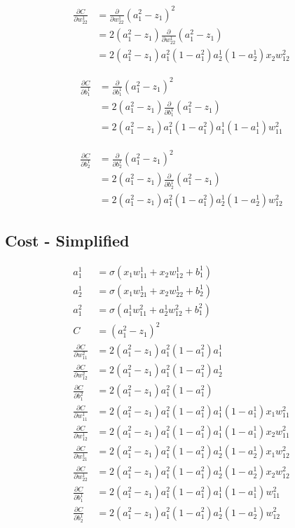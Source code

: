 \documentclass{article}
\begin{document}
\begin{align*}
\frac{\partial C}{\partial w^1_{22}} &= \frac{\partial}{\partial w^1_{22}} (a^2_1 - z_1)^2\\
&= 2 (a^2_1 - z_1) \frac{\partial}{\partial w^1_{22}} (a^2_1 - z_1)\\
&= 2 (a^2_1 - z_1) a^2_1(1 - a^2_1)a^1_2(1 - a^1_2)x_2w^2_{12}
\end{align*}

\begin{align*}
\frac{\partial C}{\partial b^1_1} &= \frac{\partial}{\partial b^1_1} (a^2_1 - z_1)^2\\
&= 2 (a^2_1 - z_1) \frac{\partial}{\partial b^1_1} (a^2_1 - z_1)\\
&= 2 (a^2_1 - z_1) a^2_1(1 - a^2_1)a^1_1(1 - a^1_1)w^2_{11}
\end{align*}

\begin{align*}
\frac{\partial C}{\partial b^1_2} &= \frac{\partial}{\partial b^1_2} (a^2_1 - z_1)^2\\
&= 2 (a^2_1 - z_1) \frac{\partial}{\partial b^1_2} (a^2_1 - z_1)\\
&= 2 (a^2_1 - z_1) a^2_1(1 - a^2_1)a^1_2(1 - a^1_2)w^2_{12}
\end{align*}

\subsection{Cost - Simplified}

\begin{align*}
a^1_1 &= \sigma(x_1 w^1_{11} + x_2 w^1_{12} + b^1_1)\\
a^1_2 &= \sigma(x_1 w^1_{21} + x_2 w^1_{22} + b^1_2)\\
a^2_1 &= \sigma(a^1_1 w^2_{11} + a^1_2 w^2_{12} + b^2_1)\\
%
C &= (a^2_1 - z_1)^2\\
%
\frac{\partial C}{\partial w^2_{11}} &= 2 (a^2_1 - z_1) a^2_1(1 - a^2_1)a^1_1\\
%
\frac{\partial C}{\partial w^2_{12}} &= 2 (a^2_1 - z_1) a^2_1(1 - a^2_1)a^1_2\\
%
\frac{\partial C}{\partial b^2_{1}} &= 2 (a^2_1 - z_1) a^2_1(1 - a^2_1)\\
%
\frac{\partial C}{\partial w^1_{11}} &= 2 (a^2_1 - z_1) a^2_1(1 - a^2_1)a^1_1(1 - a^1_1)x_1w^2_{11}\\
%
\frac{\partial C}{\partial w^1_{12}} &= 2 (a^2_1 - z_1) a^2_1(1 - a^2_1)a^1_1(1 - a^1_1)x_2w^2_{11}\\
%
\frac{\partial C}{\partial w^1_{21}} &= 2 (a^2_1 - z_1) a^2_1(1 - a^2_1)a^1_2(1 - a^1_2)x_1w^2_{12}\\
%
\frac{\partial C}{\partial w^1_{22}} &= 2 (a^2_1 - z_1) a^2_1(1 - a^2_1)a^1_2(1 - a^1_2)x_2w^2_{12}\\
%
\frac{\partial C}{\partial b^1_1} &= 2 (a^2_1 - z_1) a^2_1(1 - a^2_1)a^1_1(1 - a^1_1)w^2_{11}\\
%
\frac{\partial C}{\partial b^1_2} &= 2 (a^2_1 - z_1) a^2_1(1 - a^2_1)a^1_2(1 - a^1_2)w^2_{12}\\
\end{align*}
\end{document}
